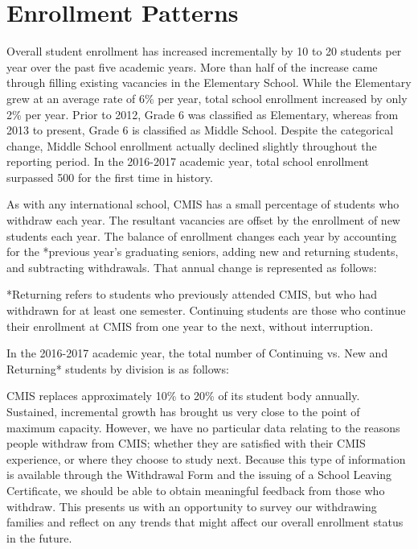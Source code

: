 \section{Enrollment Patterns}


Overall student enrollment has increased incrementally by 10 to 20 students per year over the past five academic years.  More than half of the increase came through filling existing vacancies in the Elementary School.  While the Elementary grew at an average rate of 6\% per year, total school enrollment increased by only 2\% per year.  Prior to 2012, Grade 6 was classified as Elementary, whereas from 2013 to present, Grade 6 is classified as Middle School.  Despite the categorical change, Middle School enrollment actually declined slightly throughout the reporting period.  In the 2016-2017 academic year, total school enrollment surpassed 500 for the first time in history.  

As with any international school, CMIS has a small percentage of students who withdraw each year. The resultant vacancies are offset by the enrollment of new students each year.  The balance of enrollment changes each year by accounting for the *previous year’s graduating seniors, adding new and returning students, and subtracting withdrawals.  That annual change is represented as follows:




*Returning refers to students who previously attended CMIS, but who had withdrawn for at least one semester.  Continuing students are those who continue their enrollment at CMIS from one year to the next, without interruption.  

In the 2016-2017 academic year, the total number of Continuing vs. New and Returning* students by division is as follows:



CMIS replaces approximately 10\% to 20\% of its student body annually.  Sustained, incremental growth has brought us very close to the point of maximum capacity.  However, we have no particular data relating to the reasons people withdraw from CMIS; whether they are satisfied with their CMIS experience, or where they choose to study next.  Because this type of information is available through the Withdrawal Form and the issuing of a School Leaving Certificate, we should be able to obtain meaningful feedback from those who withdraw.  This presents us with an opportunity to survey our withdrawing families and reflect on any trends that might affect our overall enrollment status in the future. 

